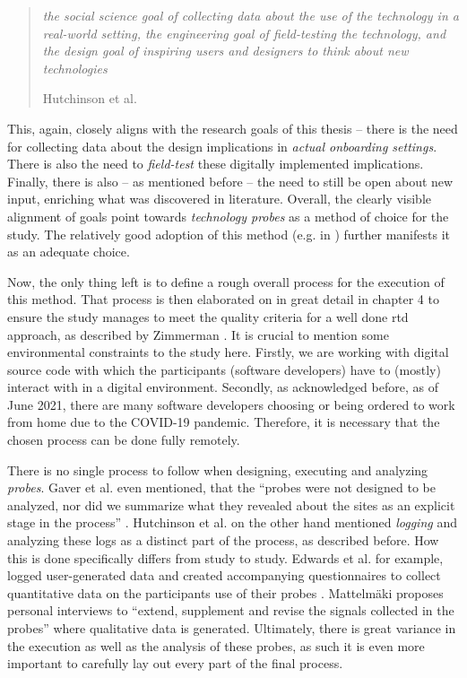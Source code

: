 \begin{quote}
  \textit{the social science goal of collecting data about the use of the technology in a real-world setting, the engineering goal of field-testing the technology, and the design goal of inspiring users and designers to think about new technologies}

  \footnotesize{Hutchinson et al. \cite[p. 17]{hutchinson2003technology}}
\end{quote}

This, again, closely aligns with the research goals of this thesis -- there is the need for collecting data about the design implications in \textit{actual onboarding settings}. There is also the need to \textit{field-test} these digitally implemented implications. Finally, there is also -- as mentioned before -- the need to still be open about new input, enriching what was discovered in literature. Overall, the clearly visible alignment of goals point towards \textit{technology probes} as a method of choice for the study. The relatively good adoption of this method (e.g. in \cite{fitton2004probing,o2006holding,edwards2011exploring}) further manifests it as an adequate choice.

Now, the only thing left is to define a rough overall process for the execution of this method. That process is then elaborated on in great detail in chapter 4 to ensure the study manages to meet the quality criteria for a well done \gls{rtd} approach, as described by Zimmerman \cite[p. 499]{zimmerman2007research}. It is crucial to mention some environmental constraints to the study here. Firstly, we are working with digital source code with which the participants (software developers) have to (mostly) interact with in a digital environment. Secondly, as acknowledged before, as of June 2021, there are many software developers choosing or being ordered to work from home due to the COVID-19 pandemic. Therefore, it is necessary that the chosen process can be done fully remotely.

There is no single process to follow when designing, executing and analyzing \textit{probes}. Gaver et al. even mentioned, that the \enquote{probes were not designed to be analyzed, nor did we summarize what they revealed about the sites as an explicit stage in the process} \cite[p. 27]{gaver1999design}. Hutchinson et al. on the other hand mentioned \textit{logging} and analyzing these logs as a distinct part of the process, as described before. How this is done specifically differs from study to study. Edwards et al. for example, logged user-generated data and created accompanying questionnaires to collect quantitative data on the participants use of their probes \cite[p. 107-110]{edwards2011exploring}. Mattelmäki proposes personal interviews to \enquote{extend, supplement and revise the signals collected in the probes} \cite[p. 86]{mattelmaki2006design} where qualitative data is generated. Ultimately, there is great variance in the execution as well as the analysis of these probes, as such it is even more important to carefully lay out every part of the final process.

